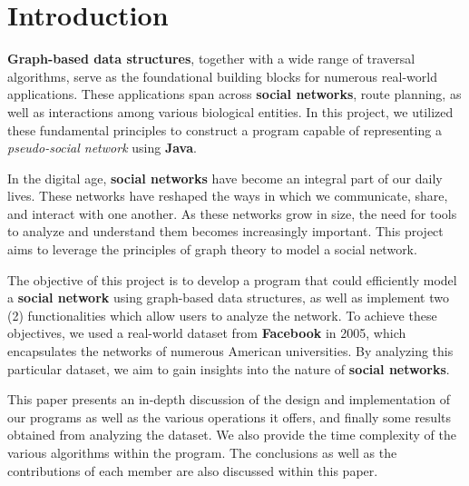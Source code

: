 \section*{\textbf{Introduction}}

\textbf{Graph-based data structures}, together with a wide range of traversal algorithms, serve as the foundational building blocks for numerous real-world applications. These applications span across \textbf{social networks}, route planning, as well as interactions among various biological entities. In this project, we utilized these fundamental principles to construct a program capable of representing a \textit{pseudo-social network} using \textbf{Java}.

In the digital age, \textbf{social networks} have become an integral part of our daily lives. These networks have reshaped the ways in which we communicate, share, and interact with one another. As these networks grow in size, the need for tools to analyze and understand them becomes increasingly important. This project aims to leverage the principles of graph theory to model a social network.\cite{HUMMON1990273}

The objective of this project is to develop a program that could efficiently model a \textbf{social network} using graph-based data structures, as well as implement two (2) functionalities which allow users to analyze the network. To achieve these objectives, we used a real-world dataset from \textbf{Facebook} in 2005, which encapsulates the networks of numerous American universities. By analyzing this particular dataset, we aim to gain insights into the nature of \textbf{social networks}.

This paper presents an in-depth discussion of the design and implementation of our programs as well as the various operations it offers, and finally some results obtained from analyzing the dataset. We also provide the time complexity of the various algorithms within the program. The conclusions as well as the contributions of each member are also discussed within this paper.
